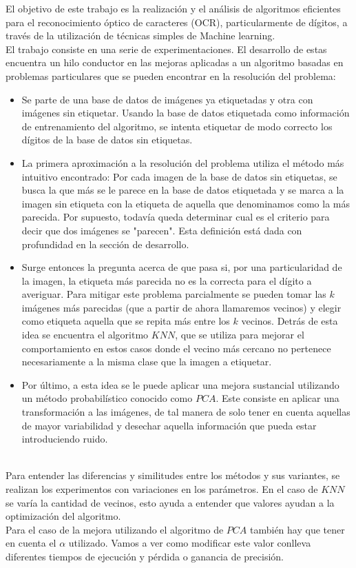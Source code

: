 El objetivo de este trabajo es la realización y el análisis de algoritmos eficientes para el reconocimiento óptico de caracteres (OCR), particularmente de dígitos,  a través de la utilización de técnicas simples de Machine learning.
\\
El trabajo consiste en una serie de experimentaciones. El desarrollo de estas encuentra un hilo conductor en las mejoras aplicadas a un algoritmo basadas en problemas particulares que se pueden encontrar en la resolución del problema: 

\begin{itemize}

  \item Se parte de una base de datos de imágenes ya etiquetadas y otra con imágenes sin etiquetar. Usando la base de datos etiquetada como información de entrenamiento del algoritmo, se intenta etiquetar de modo correcto los dígitos de la base de datos sin etiquetas.

  \item La primera aproximación a la resolución del problema utiliza el método más intuitivo encontrado: Por cada imagen de la base de datos sin etiquetas, se busca la que más se le parece en la base de datos etiquetada y se marca a la imagen sin etiqueta con la etiqueta de aquella que denominamos como la más parecida. Por supuesto, todavía queda determinar cual es el criterio para decir que dos imágenes se "parecen". Esta definición está dada con profundidad en la sección de desarrollo.

  \item Surge entonces la pregunta acerca de que pasa si, por una particularidad de la imagen, la etiqueta más parecida no es la correcta para el dígito a averiguar. Para mitigar este problema parcialmente se pueden tomar las $k$ imágenes más parecidas (que a partir de ahora llamaremos vecinos) y elegir como etiqueta aquella que se repita más entre los $k$ vecinos. Detrás de esta idea se encuentra el algoritmo $KNN$, que se utiliza para mejorar el comportamiento en estos casos donde el vecino más cercano no pertenece necesariamente a la misma clase que la imagen a etiquetar.

  \item Por último, a esta idea se le puede aplicar una mejora sustancial utilizando un método probabilístico conocido como $PCA$. Este consiste en aplicar una transformación a las imágenes, de tal manera de solo tener en cuenta aquellas de mayor variabilidad y desechar aquella información que pueda estar introduciendo ruido.

\end{itemize}

\\
Para entender las diferencias y similitudes entre los métodos y sus variantes, se realizan los experimentos con variaciones en los parámetros. En el caso de
$KNN$ se varía la cantidad de vecinos, esto ayuda a entender que valores ayudan a la optimización del algoritmo.
\\
Para el caso de la mejora utilizando el algoritmo de $PCA$ también hay que tener en cuenta el $\alpha$ utilizado. Vamos a ver como modificar este valor
conlleva diferentes tiempos de ejecución y pérdida o ganancia de precisión.
